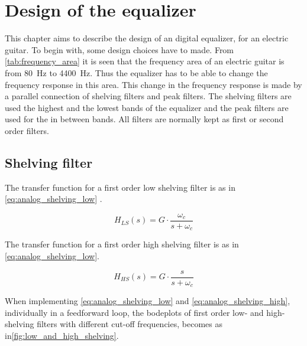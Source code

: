 \section{Design of the equalizer}
This chapter aims to describe the design of an digital equalizer, for an electric guitar. 
To begin with, some design choices have to made. From \autoref{tab:frequency_area} it is seen that the frequency area of an electric guitar is from \SI{80}{\hertz} to \SI{4400}{\hertz}. Thus the equalizer has to be able to change the frequency response in this area. This change in the frequency response is made by a parallel connection of shelving filters and peak filters. The shelving filters are used the highest and the lowest bands of the equalizer and the peak filters are used for the in between bands. All filters are normally kept as first or second order filters. 

\subsection{Shelving filter}
The transfer function for a first order low shelving filter is as in \autoref{eq:analog_shelving_low} \citep{Julius_smith}.

\begin{equation}\label{eq:analog_shelving_low}
        H_{LS}(s) = G \cdot \frac{\omega_c}{s+\omega_c}
    \end{equation}

    \startexplain
    \stopexplain
    
The transfer function for a first order high shelving filter is as in \autoref{eq:analog_shelving_low}.

\begin{equation}\label{eq:analog_shelving_high}
        H_{HS}(s) = G \cdot \frac{s}{s+\omega_c}
    \end{equation}

    \startexplain
    \stopexplain

    
When implementing \autoref{eq:analog_shelving_low} and \autoref{eq:analog_shelving_high}, individually in a feedforward loop, the bodeplots of first order low- and high- shelving filters with different cut-off frequencies, becomes as in\autoref{fig:low_and_high_shelving}.

